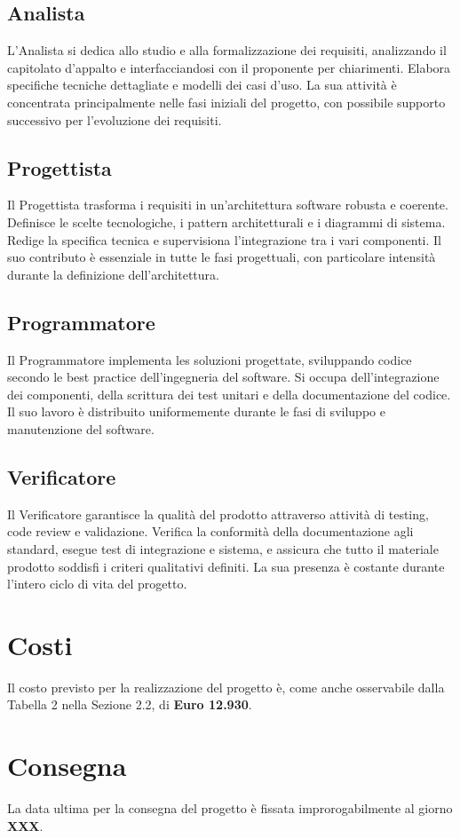 \documentclass[a4paper,11pt]{article}
\begin{document}
\subsection{Analista}
L'Analista si dedica allo studio e alla formalizzazione dei requisiti, analizzando il capitolato d'appalto e interfacciandosi con il proponente per chiarimenti. Elabora specifiche tecniche dettagliate e modelli dei casi d'uso. La sua attività è concentrata principalmente nelle fasi iniziali del progetto, con possibile supporto successivo per l'evoluzione dei requisiti.

\subsection{Progettista}
Il Progettista trasforma i requisiti in un'architettura software robusta e coerente. Definisce le scelte tecnologiche, i pattern architetturali e i diagrammi di sistema. Redige la specifica tecnica e supervisiona l'integrazione tra i vari componenti. Il suo contributo è essenziale in tutte le fasi progettuali, con particolare intensità durante la definizione dell'architettura.

\subsection{Programmatore}
Il Programmatore implementa les soluzioni progettate, sviluppando codice secondo le best practice dell'ingegneria del software. Si occupa dell'integrazione dei componenti, della scrittura dei test unitari e della documentazione del codice. Il suo lavoro è distribuito uniformemente durante le fasi di sviluppo e manutenzione del software.

\subsection{Verificatore}
Il Verificatore garantisce la qualità del prodotto attraverso attività di testing, code review e validazione. Verifica la conformità della documentazione agli standard, esegue test di integrazione e sistema, e assicura che tutto il materiale prodotto soddisfi i criteri qualitativi definiti. La sua presenza è costante durante l'intero ciclo di vita del progetto.

\vspace{1cm}

\section{Costi}
Il costo previsto per la realizzazione del progetto è, come anche osservabile dalla Tabella 2 nella Sezione 2.2, di \textbf{Euro 12.930}.

\section{Consegna}
La data ultima per la consegna del progetto è fissata improrogabilmente al giorno \textbf{XXX}.
\end{document}
